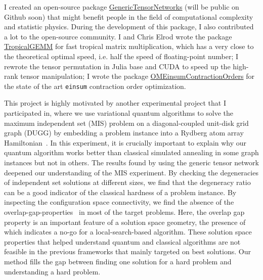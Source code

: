 \documentclass[a4paper]{article}
\newcommand{\<}{\langle}
\renewcommand{\>}{\rangle}
\begin{document}
I created an open-source package \href{https://github.com/QuEraComputing/GenericTensorNetworks.jl}{GenericTensorNetworks} (will be public on Github soon) that might benefit people in the field of computational complexity and statistic physics.
During the development of this package, I also contributed a lot to the open-source community. I and Chris Elrod wrote the package \href{https://github.com/TensorBFS/TropicalGEMM.jl/}{TropicalGEMM} for fast tropical matrix multiplication, which has a very close to the theoretical optimal speed, i.e. half the speed of floating-point number; I rewrote the tensor permutation in Julia base and CUDA to speed up the high-rank tensor manipulation; I wrote the package \href{https://github.com/TensorBFS/OMEinsumContractionOrders.jl}{OMEinsumContractionOrders} for the state of the art \texttt{einsum} contraction order optimization.


This project is highly motivated by another experimental project that I participated in, where we use variational quantum algorithms to solve the maximum independent set (MIS) problem on a diagonal-coupled unit-disk grid graph (DUGG) by embedding a problem instance into a Rydberg atom array Hamiltonian~\cite{Ebadi2022}.
In this experiment, it is crucially important to explain why our quantum algorithm works better than classical simulated annealing in some graph instances but not in others.
The results found by using the generic tensor network deepened our understanding of the MIS experiment.
By checking the degeneracies of independent set solutions at different sizes, we find that the degeneracy ratio can be a good indicator of the classical hardness of a problem instance.
By inspecting the configuration space connectivity, we find the absence of the overlap-gap-properties~\cite{Gamarnik2021} in most of the target problems.
Here, the overlap gap property is an important feature of a solution space geometry, the presence of which indicates a no-go for a local-search-based algorithm.
These solution space properties that helped understand quantum and classical algorithms are not feasible in the previous frameworks that mainly targeted on best solutions. Our method fills the gap between finding one solution for a hard problem and understanding a hard problem.

\end{document}
